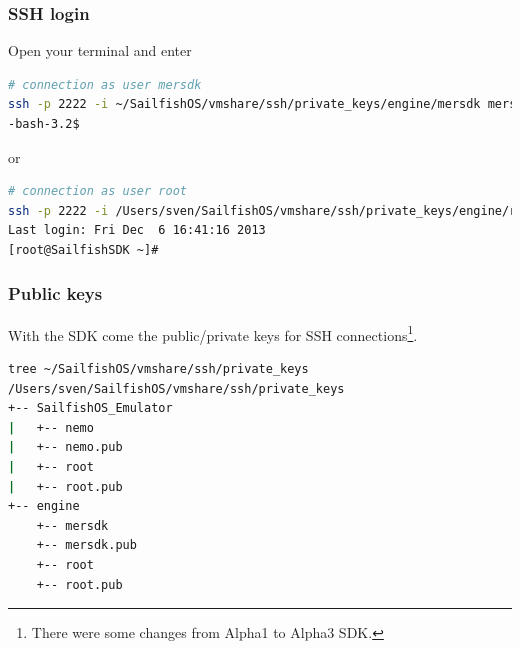 \subsubsection{SSH login}\label{subsubsec:mersdk:sshlogin}
%
Open your terminal and enter
%
\begin{lstlisting}[language=bash]
# connection as user mersdk
ssh -p 2222 -i ~/SailfishOS/vmshare/ssh/private_keys/engine/mersdk mersdk@localhost
-bash-3.2$ 
\end{lstlisting}
%
or
%
\begin{lstlisting}[language=bash]
# connection as user root
ssh -p 2222 -i /Users/sven/SailfishOS/vmshare/ssh/private_keys/engine/root root@localhost
Last login: Fri Dec  6 16:41:16 2013
[root@SailfishSDK ~]# 
\end{lstlisting}
%
%
\subsubsection{Public keys}
%
With the SDK come the public/private keys for SSH connections\footnote{There were some changes from Alpha1 to Alpha3 SDK.}.
%
\begin{lstlisting}[language=bash]
tree ~/SailfishOS/vmshare/ssh/private_keys 
/Users/sven/SailfishOS/vmshare/ssh/private_keys
+-- SailfishOS_Emulator
|   +-- nemo
|   +-- nemo.pub
|   +-- root
|   +-- root.pub
+-- engine
    +-- mersdk
    +-- mersdk.pub
    +-- root
    +-- root.pub
\end{lstlisting}
%
